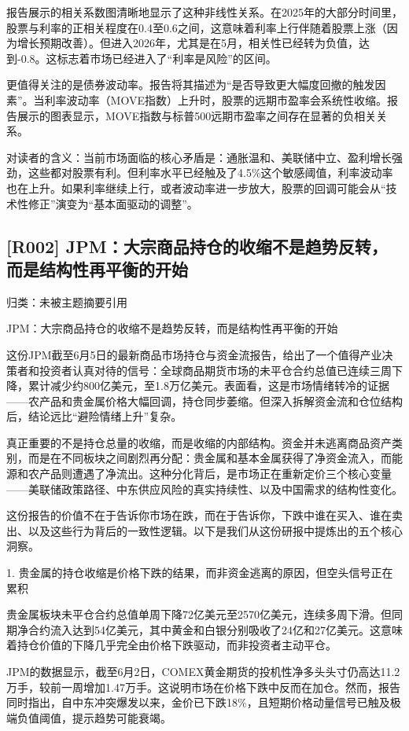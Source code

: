\documentclass[11pt]{ctexart}
\begin{document}
报告展示的相关系数图清晰地显示了这种非线性关系。在2025年的大部分时间里，股票与利率的正相关程度在0.4至0.6之间，这意味着利率上行伴随着股票上涨（因为增长预期改善）。但进入2026年，尤其是在5月，相关性已经转为负值，达到-0.8。这标志着市场已经进入了“利率是风险”的区间。

更值得关注的是债券波动率。报告将其描述为“是否导致更大幅度回撤的触发因素”。当利率波动率（MOVE指数）上升时，股票的远期市盈率会系统性收缩。报告展示的图表显示，MOVE指数与标普500远期市盈率之间存在显著的负相关关系。

对读者的含义：当前市场面临的核心矛盾是：通胀温和、美联储中立、盈利增长强劲，这些都对股票有利。但利率水平已经触及了4.5\%这个敏感阈值，利率波动率也在上升。如果利率继续上行，或者波动率进一步放大，股票的回调可能会从“技术性修正”演变为“基本面驱动的调整”。

\subsection{[R002] JPM：大宗商品持仓的收缩不是趋势反转，而是结构性再平衡的开始}
{\small\color{refgray}归类：未被主题摘要引用}

JPM：大宗商品持仓的收缩不是趋势反转，而是结构性再平衡的开始

这份JPM截至6月5日的最新商品市场持仓与资金流报告，给出了一个值得产业决策者和投资者认真对待的信号：全球商品期货市场的未平仓合约总值已连续三周下降，累计减少约800亿美元，至1.8万亿美元。表面看，这是市场情绪转冷的证据——农产品和贵金属价格大幅回调，持仓同步萎缩。但深入拆解资金流和仓位结构后，结论远比“避险情绪上升”复杂。

真正重要的不是持仓总量的收缩，而是收缩的内部结构。资金并未逃离商品资产类别，而是在不同板块之间剧烈再分配：贵金属和基本金属获得了净资金流入，而能源和农产品则遭遇了净流出。这种分化背后，是市场正在重新定价三个核心变量——美联储政策路径、中东供应风险的真实持续性、以及中国需求的结构性变化。

这份报告的价值不在于告诉你市场在跌，而在于告诉你，下跌中谁在买入、谁在卖出、以及这些行为背后的一致性逻辑。以下是我们从这份研报中提炼出的五个核心洞察。

1. 贵金属的持仓收缩是价格下跌的结果，而非资金逃离的原因，但空头信号正在累积

贵金属板块未平仓合约总值单周下降72亿美元至2570亿美元，连续多周下滑。但同期净合约流入达到54亿美元，其中黄金和白银分别吸收了24亿和27亿美元。这意味着持仓价值的下降几乎完全由价格下跌驱动，而非投资者主动平仓。

JPM的数据显示，截至6月2日，COMEX黄金期货的投机性净多头头寸仍高达11.2万手，较前一周增加1.47万手。这说明市场在价格下跌中反而在加仓。然而，报告同时指出，自中东冲突爆发以来，金价已下跌18\%，且短期价格动量信号已触及极端负值阈值，提示趋势可能衰竭。
\end{document}
